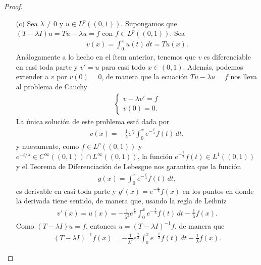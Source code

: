 \begin{proof}
\begin{enumerate}
        \item[(c)] Sea $\lambda\neq 0$ y $u \in L^p((0,1))$. Supongamos que $(T-\lambda I)u=Tu-\lambda u=f$ con $f \in L^p((0,1))$. Sea
        \begin{align*}
            v(x)=\int_0^x u(t)\, dt=Tu(x).
        \end{align*}
        Análogamente a lo hecho en el ítem anterior, tenemos que $v$ es diferenciable en casi toda parte y $v'=u$ para casi todo $x \in (0,1)$. Además, podemos extender a $v$ por $v(0)=0$, de manera que la ecuación $Tu-\lambda u=f$ nos lleva al problema de Cauchy
        \begin{align*}
            \begin{cases}
                v-\lambda v'=f\\
                v(0)=0.
            \end{cases}
        \end{align*}
        La única solución de este problema está dada por
        \begin{align*}
            v(x)=-\frac{1}{\lambda}e^{\frac{x}{\lambda}}\int_0^x e^{-\frac{t}{\lambda}}f(t)\, dt,
        \end{align*}
        y nuevamente, como $f \in L^p((0,1))$ y $e^{-t/\lambda}\in C^\infty((0,1))\cap L^\infty((0,1))$, la función $e^{-\frac{t}{\lambda}}f(t)\in L^1((0,1))$ y el Teorema de Diferenciación de Lebesgue nos garantiza que la función
        \begin{align*}
            g(x)=\int_0^x e^{-\frac{t}{\lambda}}f(t)\, dt,
        \end{align*}
        es derivable en casi toda parte y $g'(x)=e^{-\frac{x}{\lambda}}f(x)$ en los puntos en donde la derivada tiene sentido, de manera que, usando la regla de Leibniz 
        \begin{align*}
            v'(x)=u(x)=-\frac{1}{\lambda^2}e^{\frac{x}{\lambda}}\int_0^x e^{-\frac{t}{\lambda}}f(t)\, dt-\frac{1}{\lambda}f(x).
        \end{align*}
        Como $(T-\lambda I)u=f$, entonces $u=(T-\lambda I)^{-1}f$, de manera que
        \begin{align*}
            (T-\lambda I)^{-1}f(x)=-\frac{1}{\lambda^2}e^{\frac{x}{\lambda}}\int_0^x e^{-\frac{t}{\lambda}}f(t)\, dt-\frac{1}{\lambda}f(x).
        \end{align*}


\end{enumerate}
\end{proof}
